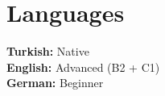 \documentclass[10pt, a4paper]{article}
\begin{document}
\vspace{-16pt}

\section{Languages}

\noindent\textbf{Turkish:} Native \\
\textbf{English:} Advanced (B2 + C1) \\
\textbf{German:} Beginner
\end{document}
